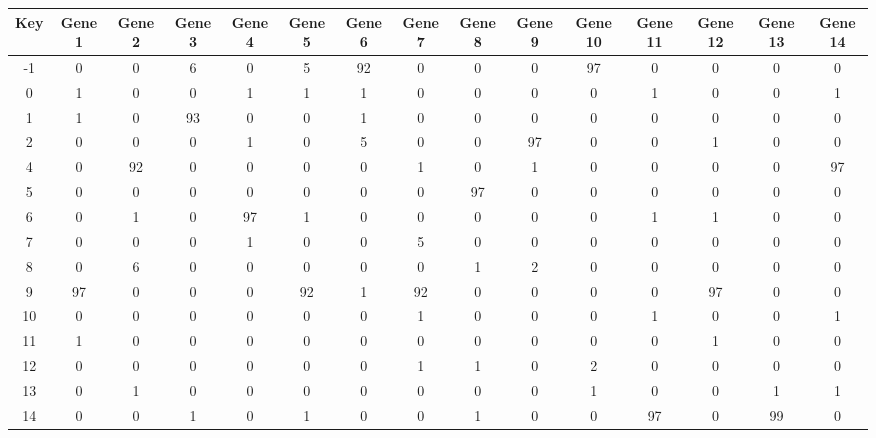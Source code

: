 \begin{tabular}{|c|c|c|c|c|c|c|c|c|c|c|c|c|c|c|}
\hline
Key & Gene 1 & Gene 2 & Gene 3 & Gene 4 & Gene 5 & Gene 6 & Gene 7 & Gene 8 & Gene 9 & Gene 10 & Gene 11 & Gene 12 & Gene 13 & Gene 14 \\
\hline
-1 & 0 & 0 & 6 & 0 & 5 & 92 & 0 & 0 & 0 & 97 & 0 & 0 & 0 & 0 \\
0 & 1 & 0 & 0 & 1 & 1 & 1 & 0 & 0 & 0 & 0 & 1 & 0 & 0 & 1 \\
1 & 1 & 0 & 93 & 0 & 0 & 1 & 0 & 0 & 0 & 0 & 0 & 0 & 0 & 0 \\
2 & 0 & 0 & 0 & 1 & 0 & 5 & 0 & 0 & 97 & 0 & 0 & 1 & 0 & 0 \\
4 & 0 & 92 & 0 & 0 & 0 & 0 & 1 & 0 & 1 & 0 & 0 & 0 & 0 & 97 \\
5 & 0 & 0 & 0 & 0 & 0 & 0 & 0 & 97 & 0 & 0 & 0 & 0 & 0 & 0 \\
6 & 0 & 1 & 0 & 97 & 1 & 0 & 0 & 0 & 0 & 0 & 1 & 1 & 0 & 0 \\
7 & 0 & 0 & 0 & 1 & 0 & 0 & 5 & 0 & 0 & 0 & 0 & 0 & 0 & 0 \\
8 & 0 & 6 & 0 & 0 & 0 & 0 & 0 & 1 & 2 & 0 & 0 & 0 & 0 & 0 \\
9 & 97 & 0 & 0 & 0 & 92 & 1 & 92 & 0 & 0 & 0 & 0 & 97 & 0 & 0 \\
10 & 0 & 0 & 0 & 0 & 0 & 0 & 1 & 0 & 0 & 0 & 1 & 0 & 0 & 1 \\
11 & 1 & 0 & 0 & 0 & 0 & 0 & 0 & 0 & 0 & 0 & 0 & 1 & 0 & 0 \\
12 & 0 & 0 & 0 & 0 & 0 & 0 & 1 & 1 & 0 & 2 & 0 & 0 & 0 & 0 \\
13 & 0 & 1 & 0 & 0 & 0 & 0 & 0 & 0 & 0 & 1 & 0 & 0 & 1 & 1 \\
14 & 0 & 0 & 1 & 0 & 1 & 0 & 0 & 1 & 0 & 0 & 97 & 0 & 99 & 0 \\
\hline
\end{tabular}